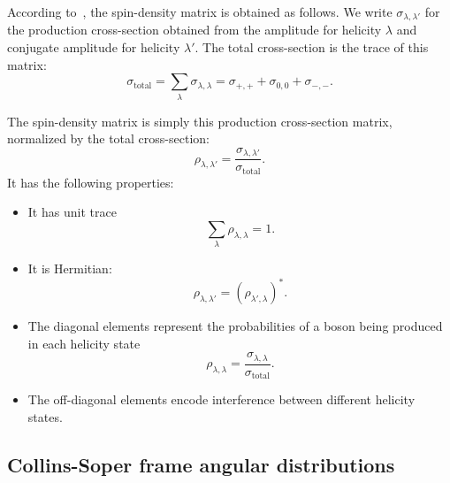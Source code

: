 \documentclass[11pt]{article}
\begin{document}
According to~\cite{gaoPrecisionStudiesBoosted2026}, the spin-density matrix is obtained as follows. 
We write $\sigma_{\lambda, \lambda'}$ for the production cross-section obtained from the amplitude for helicity $\lambda$ and conjugate amplitude for helicity $\lambda'$.
The total cross-section is the trace of this matrix:
\begin{equation}
    \sigma_{\text{total}} = \sum_\lambda \sigma_{\lambda, \lambda} = \sigma_{+,+} + \sigma_{0,0} + \sigma_{-,-}.
\end{equation}

The spin-density matrix is simply this production cross-section matrix, normalized by the total cross-section:
\begin{equation}
    \rho_{\lambda, \lambda'} = \frac{\sigma_{\lambda, \lambda'}}{\sigma_{\text{total}}}.
\end{equation}
It has the following properties:
\begin{itemize}
    \item It has unit trace
    \begin{equation}
        \sum_\lambda \rho_{\lambda, \lambda} = 1.
    \end{equation}
    \item It is Hermitian:
    \begin{equation}
        \rho_{\lambda, \lambda'} = (\rho_{\lambda', \lambda})^*.
    \end{equation}
    \item The diagonal elements represent the probabilities of a boson being produced in each helicity state
    \begin{equation}
        \rho_{\lambda, \lambda} = \frac{\sigma_{\lambda, \lambda}}{\sigma_{\text{total}}}.
    \end{equation}
    \item The off-diagonal elements encode interference between different helicity states. 
\end{itemize}

\subsection{Collins-Soper frame angular distributions}
\end{document}

